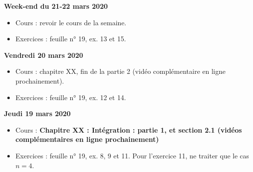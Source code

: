 \documentclass[12pt,a4paper]{article}
\begin{document}
% 
% 

\noindent\textbf{Week-end du 21-22 mars 2020}
\begin{itemize}
\item Cours : revoir le cours de la semaine.
\item Exercices : feuille n° 19, ex. 13 et 15.\vspace{.4cm}
\end{itemize}


\noindent\textbf{\bf Vendredi 20 mars 2020}
\begin{itemize}
\item Cours : chapitre XX, fin de la partie 2 (vidéo complémentaire en ligne prochainement).
\item Exercices : feuille n° 19, ex. 12 et 14.\vspace{.4cm}
\end{itemize}
 
\noindent\textbf{Jeudi 19 mars 2020}
\begin{itemize}
\item Cours : \bf Chapitre XX \rm : Intégration : partie 1, et section 2.1 (vidéos complémentaires en ligne prochainement)
\item Exercices : feuille n° 19, ex. 8, 9 et 11. Pour l'exercice 11, ne traiter que le cas $n=4$.\vspace{.4cm}
\end{itemize}
\end{document}
